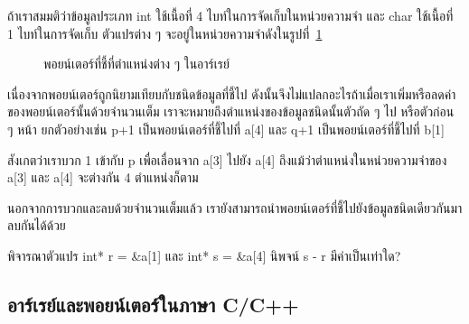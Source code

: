 ถ้า{\wbr}เรา{\wbr}สมมติ{\wbr}ว่า{\wbr}ข้อมูล{\wbr}ประเภท {\ct int} ใช้{\wbr}เนื้อที่ 4 ไบท์ใน{\wbr}การ{\wbr}จัด{\wbr}เก็บ{\wbr}ใน{\wbr}หน่วย{\wbr}ความ{\wbr}จำ และ{\wbr}
{\ct char} ใช้{\wbr}เนื้อที่ 1 ไบท์ใน{\wbr}การ{\wbr}จัด{\wbr}เก็บ ตัวแปร{\wbr}ต่าง ๆ
จะ{\wbr}อยู่{\wbr}ใน{\wbr}หน่วย{\wbr}ความ{\wbr}จำ{\wbr}ดัง{\wbr}ใน{\wbr}รูป{\wbr}ที่~\ref{fig:array-array-pointer-arith}

\begin{figure}
\begin{center}
\end{center}
\caption{พอยน์เตอร์ที่{\wbr}ชี้{\wbr}ที่{\wbr}ตำแหน่ง{\wbr}ต่าง ๆ ใน{\wbr}อาร์{\wbr}เรย์}
\label{fig:array-array-pointer-arith}
\end{figure}

เนื่อง{\wbr}จาก{\wbr}พอยน์เตอร์{\wbr}ถูก{\wbr}นิยาม{\wbr}เทียบ{\wbr}กับ{\wbr}ชนิด{\wbr}ข้อมูล{\wbr}ที่{\wbr}ชี้{\wbr}ไป{\wbr}
ดังนั้น{\wbr}จึง{\wbr}ไม่{\wbr}แปลก{\wbr}อะไร{\wbr}ถ้า{\wbr}เมื่อ{\wbr}เรา{\wbr}เพิ่ม{\wbr}หรือ{\wbr}ลด{\wbr}ค่า{\wbr}ของ{\wbr}พอยน์เตอร์{\wbr}นั้น{\wbr}ด้วย{\wbr}จำนวน{\wbr}เต็ม{\wbr}
เรา{\wbr}จะ{\wbr}หมาย{\wbr}ถึง{\wbr}ตำแหน่ง{\wbr}ของ{\wbr}ข้อมูล{\wbr}ชนิด{\wbr}นั้น{\wbr}ตัว{\wbr}ถัด ๆ ไป หรือ{\wbr}ตัว{\wbr}ก่อน ๆ หน้า ยก{\wbr}ตัวอย่าง{\wbr}เช่น {\ct
  p+1} เป็น{\wbr}พอยน์เตอร์{\wbr}ที่{\wbr}ชี้{\wbr}ไป{\wbr}ที่ {\ct a[4]} และ {\ct q+1} เป็น{\wbr}พอยน์เตอร์{\wbr}ที่{\wbr}ชี้{\wbr}ไป{\wbr}ที่{\wbr}
{\ct b[1]}

สังเกต{\wbr}ว่า{\wbr}เรา{\wbr}บวก 1 เข้า{\wbr}กับ {\ct p} เพื่อ{\wbr}เลื่อน{\wbr}จาก {\ct a[3]} ไป{\wbr}ยัง {\ct a[4]}
ถึง{\wbr}แม้{\wbr}ว่า{\wbr}ตำแหน่ง{\wbr}ใน{\wbr}หน่วย{\wbr}ความ{\wbr}จำ{\wbr}ของ {\ct a[3]} และ {\ct a[4]} จะ{\wbr}ต่าง{\wbr}กัน 4
ตำแหน่ง{\wbr}ก็{\wbr}ตาม{\wbr}

นอกจาก{\wbr}การ{\wbr}บวก{\wbr}และ{\wbr}ลบ{\wbr}ด้วย{\wbr}จำนวน{\wbr}เต็ม{\wbr}แล้ว{\wbr}
เรา{\wbr}ยัง{\wbr}สามารถ{\wbr}นำ{\wbr}พอยน์เตอร์{\wbr}ที่{\wbr}ชี้{\wbr}ไป{\wbr}ยัง{\wbr}ข้อมูล{\wbr}ชนิด{\wbr}เดียวกัน{\wbr}มา{\wbr}ลบ{\wbr}กัน{\wbr}ได้{\wbr}ด้วย{\wbr}

\begin{quiz}{}
พิจารณา{\wbr}ตัวแปร {\ct int* r = \&a[1]} และ {\ct int* s = \&a[4]} นิพจน์ {\ct s
  - r} มี{\wbr}ค่า{\wbr}เป็น{\wbr}เท่าใด?
\end{quiz}

\subsection{อาร์{\wbr}เรย์{\wbr}และ{\wbr}พอยน์เตอร์{\wbr}ใน{\wbr}ภาษา C/C++}
\label{sect:array-array-pointer-c}

